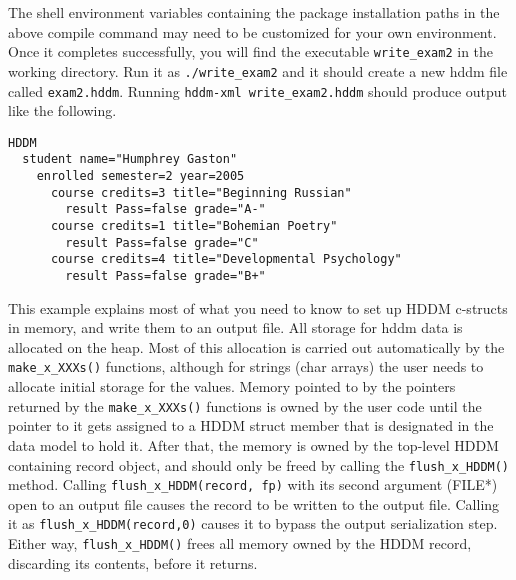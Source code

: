\documentclass{revtex4}
\begin{document}
The shell environment variables containing the package installation paths in
the above compile command may need to be customized for your own environment.
Once it completes successfully, you will find the executable \texttt{write\_exam2}
in the working directory. Run it as \texttt{./write\_exam2} and it should create
a new hddm file called \texttt{exam2.hddm}. Running
\texttt{hddm-{}xml write\_exam2.hddm} should produce output like the following.

\vspace{0.5cm}
\begin{minipage}{12cm}
\begin{verbatim}
HDDM
  student name="Humphrey Gaston"
    enrolled semester=2 year=2005
      course credits=3 title="Beginning Russian"
        result Pass=false grade="A-"
      course credits=1 title="Bohemian Poetry"
        result Pass=false grade="C"
      course credits=4 title="Developmental Psychology"
        result Pass=false grade="B+"
\end{verbatim}
\end{minipage}
\vspace{0.5cm}

This example explains most of what you need to know to set up HDDM c-structs
in memory, and write them to an output file. All storage for hddm data is
allocated on the heap. Most of this allocation is carried out automatically
by the \texttt{make\_x\_XXXs()} functions, although for strings (char arrays)
the user needs to allocate initial storage for the values. Memory pointed to
by the pointers returned by the \texttt{make\_x\_XXXs()} functions is owned
by the user code until the pointer to it gets assigned to a HDDM struct member
that is designated in the data model to hold it. After that, the memory is
owned by the top-{}level HDDM containing record object, and should only be
freed by calling the \texttt{flush\_x\_HDDM()} method. Calling
\texttt{flush\_x\_HDDM(record, fp)} with its second argument (FILE*) open
to an output file causes the record to be written to the output file.
Calling it as \texttt{flush\_x\_HDDM(record,0)} causes it to bypass the
output serialization step. Either way, \texttt{flush\_x\_HDDM()} frees all
memory owned by the HDDM record, discarding its contents, before it returns.
\end{document}

